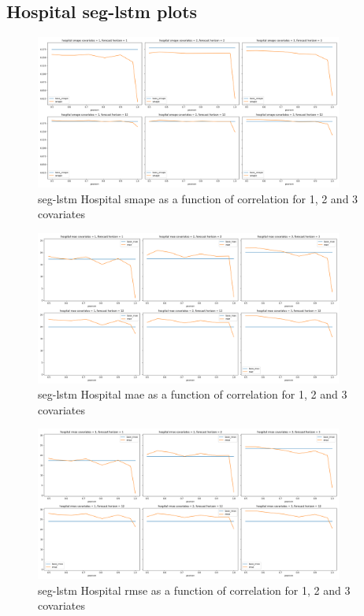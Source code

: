 \documentclass{article}
\begin{document}
\subsection{Hospital seg-lstm plots}
\begin{figure}[htbp]
\centering
\includegraphics[width=0.9\textwidth]{figures/hospital-seg-lstm-smape.png}
\caption{seg-lstm Hospital smape as a function of correlation for 1, 2 and 3 covariates}
\label{fig:seg_lstm_hospital_smape}
\end{figure}

\begin{figure}[ht]
\centering
\includegraphics[width=0.9\textwidth]{figures/hospital-seg-lstm-mae.png}
\caption{seg-lstm Hospital mae as a function of correlation for 1, 2 and 3 covariates}
\label{fig:seg_lstm_hospital_mae}
\end{figure}

\begin{figure}[ht]
\centering
\includegraphics[width=0.9\textwidth]{figures/hospital-seg-lstm-rmse.png}
\caption{seg-lstm Hospital rmse as a function of correlation for 1, 2 and 3 covariates}
\label{fig:seg_lstm_hospital_rmse}
\end{figure}
  
\end{document}
